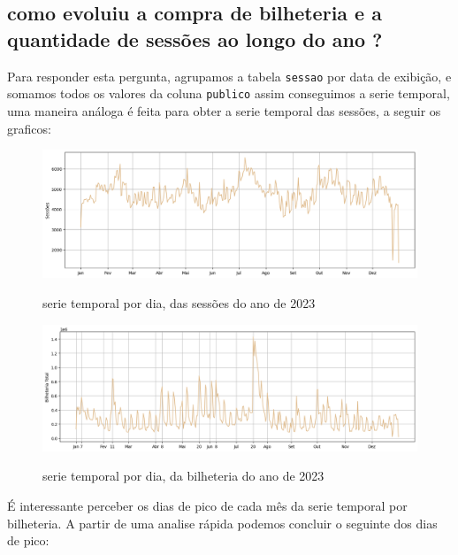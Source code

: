 \documentclass[12pt, a4paper]{article}
\begin{document}
\subsection{como evoluiu a compra de bilheteria e a quantidade de sessões ao longo do ano ?}

Para responder esta pergunta, agrupamos a tabela \texttt{sessao} por data de exibição, e somamos todos os valores da coluna \texttt{publico} assim conseguimos a serie temporal, uma maneira análoga é feita para obter a serie temporal das sessões, a seguir os graficos:

\begin{figure}[h]
    \centering
    \includegraphics[width=1\textwidth]{sessoes_dia.png}%
    \label{fig:sessoes_por_dia}
    \caption{serie temporal por dia, das sessões do ano de 2023}
\end{figure}

\begin{figure}[h]
    \centering
    \includegraphics[width=1\textwidth]{bilheteria_dia.png}%
    \label{fig:sessoes_por_dia_bilheteria}
    \caption{serie temporal por dia, da bilheteria do ano de 2023}
\end{figure}

\newpage

É interessante perceber os dias de pico de cada mês da serie temporal por bilheteria. A partir de uma analise rápida podemos concluir o seguinte dos dias de pico: 
\end{document}
